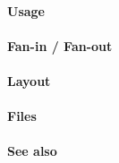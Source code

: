 \paragraph{Usage}

\paragraph{Fan-in / Fan-out}

\paragraph{Layout}

\paragraph{Files}

\paragraph{See also}
